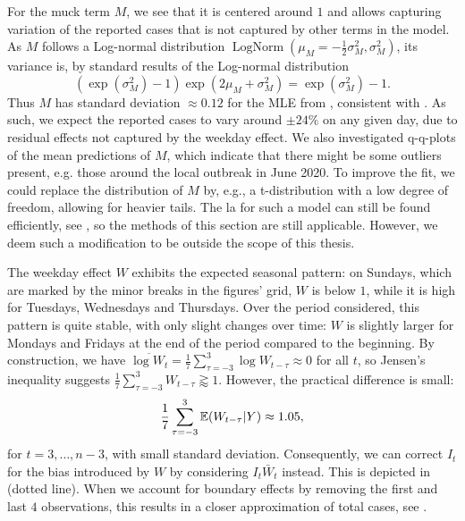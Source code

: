 For the muck term $M$, we see that it is centered around $1$ and allows capturing variation of the reported cases that is not captured by other terms in the model. As $M$ follows a Log-normal distribution $\operatorname{LogNorm}(\mu_{M} =-\frac{1}{2}\sigma^{2}_M, \sigma^{2}_M)$, its variance is, by standard results of the Log-normal distribution 
$$
    \left( \exp \left( \sigma^{2}_M \right) - 1 \right) \exp \left( 2 \mu_{M} +\sigma^{2}_M \right) = \exp \left( \sigma^{2}_M\right) - 1.
$$
Thus $M$ has standard deviation $\approx 0.12$ for the MLE from , consistent with . As such, we expect the reported cases to vary around $\pm 24\%$ on any given day, due to residual effects not captured by the weekday effect. We also investigated q-q-plots of the mean predictions of $M$, which indicate that there might be some outliers present, e.g. those around the local outbreak in June 2020. To improve the fit, we could replace the distribution of $M$ by, e.g., a t-distribution with a low degree of freedom, allowing for heavier tails. The \gls{la} for such a model can still be found efficiently, see \citep[Section 11.7.2]{Durbin2012Time}, so the methods of this section are still applicable. However, we deem such a modification to be outside the scope of this thesis. 

The weekday effect $W$ exhibits the expected seasonal pattern: on Sundays, which are marked by the minor breaks in the figures' grid, $W$ is below $1$, while it is high for Tuesdays, Wednesdays and Thursdays. Over the period considered, this pattern is quite stable, with only slight changes over time: $W$ is slightly larger for Mondays and Fridays at the end of the period compared to the beginning. By construction, we have $\overline{\log W_{t}} = \frac{1}{7}\sum_{\tau = -3}^3 \log W_{t - \tau} \approx 0$ for all $t$, so Jensen's inequality suggests $\frac{1}{7} \sum_{\tau = -3}^3 W_{t - \tau} \gtrapprox 1$. However, the practical difference is small: $$ \frac{1}{7} \sum_{\tau = -3}^3 \mathbb E (W_{t - \tau} | Y) \approx 1.05,$$ for $t = 3, \dots, n-3$, with small standard deviation. Consequently, we can correct $I_{t}$ for the bias introduced by $W$ by considering $ I_{t} \bar W_{t} $ instead. This is depicted in  (dotted line). When we account for boundary effects by removing the first and last $4$ observations, this results in a closer approximation of total cases, see .

\begin{table}
    \centering
    
    \caption{Total number of cases by different summation methods. When we account for $\bar W$, the total count is closer to the actual number of cases. All totals rounded to thousands.}
    \label{tab:total_calculation}
\end{table}

